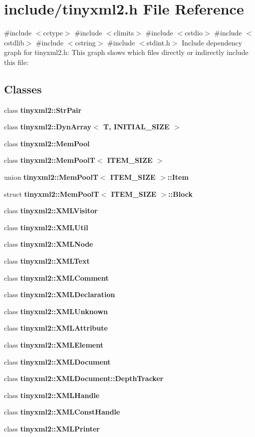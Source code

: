 \section{include/tinyxml2.h File Reference}
\label{tinyxml2_8h}
{\ttfamily \#include $<$cctype$>$}\newline
{\ttfamily \#include $<$climits$>$}\newline
{\ttfamily \#include $<$cstdio$>$}\newline
{\ttfamily \#include $<$cstdlib$>$}\newline
{\ttfamily \#include $<$cstring$>$}\newline
{\ttfamily \#include $<$stdint.\+h$>$}\newline
Include dependency graph for tinyxml2.\+h\+:
This graph shows which files directly or indirectly include this file\+:
\subsection*{Classes}
\begin{DoxyCompactItemize}
\item 
class \textbf{ tinyxml2\+::\+Str\+Pair}
\item 
class \textbf{ tinyxml2\+::\+Dyn\+Array$<$ T, I\+N\+I\+T\+I\+A\+L\+\_\+\+S\+I\+Z\+E $>$}
\item 
class \textbf{ tinyxml2\+::\+Mem\+Pool}
\item 
class \textbf{ tinyxml2\+::\+Mem\+Pool\+T$<$ I\+T\+E\+M\+\_\+\+S\+I\+Z\+E $>$}
\item 
union \textbf{ tinyxml2\+::\+Mem\+Pool\+T$<$ I\+T\+E\+M\+\_\+\+S\+I\+Z\+E $>$\+::\+Item}
\item 
struct \textbf{ tinyxml2\+::\+Mem\+Pool\+T$<$ I\+T\+E\+M\+\_\+\+S\+I\+Z\+E $>$\+::\+Block}
\item 
class \textbf{ tinyxml2\+::\+X\+M\+L\+Visitor}
\item 
class \textbf{ tinyxml2\+::\+X\+M\+L\+Util}
\item 
class \textbf{ tinyxml2\+::\+X\+M\+L\+Node}
\item 
class \textbf{ tinyxml2\+::\+X\+M\+L\+Text}
\item 
class \textbf{ tinyxml2\+::\+X\+M\+L\+Comment}
\item 
class \textbf{ tinyxml2\+::\+X\+M\+L\+Declaration}
\item 
class \textbf{ tinyxml2\+::\+X\+M\+L\+Unknown}
\item 
class \textbf{ tinyxml2\+::\+X\+M\+L\+Attribute}
\item 
class \textbf{ tinyxml2\+::\+X\+M\+L\+Element}
\item 
class \textbf{ tinyxml2\+::\+X\+M\+L\+Document}
\item 
class \textbf{ tinyxml2\+::\+X\+M\+L\+Document\+::\+Depth\+Tracker}
\item 
class \textbf{ tinyxml2\+::\+X\+M\+L\+Handle}
\item 
class \textbf{ tinyxml2\+::\+X\+M\+L\+Const\+Handle}
\item 
class \textbf{ tinyxml2\+::\+X\+M\+L\+Printer}
\end{DoxyCompactItemize}
